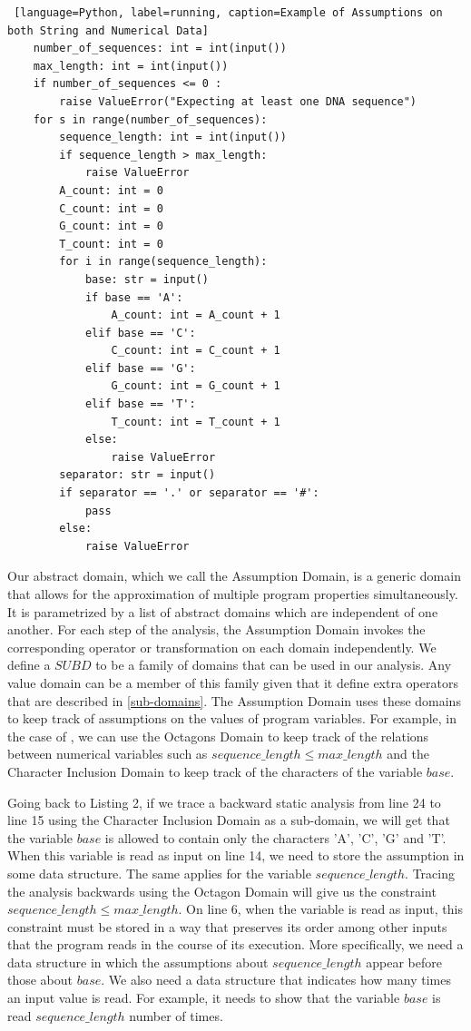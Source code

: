 \documentclass[10pt]{report}
\begin{document}
\begin{lstlisting} [language=Python, label=running, caption=Example of Assumptions on both String and Numerical Data]
	number_of_sequences: int = int(input())
	max_length: int = int(input())
	if number_of_sequences <= 0 :
		raise ValueError("Expecting at least one DNA sequence")
	for s in range(number_of_sequences):
		sequence_length: int = int(input())
		if sequence_length > max_length:
			raise ValueError
		A_count: int = 0
		C_count: int = 0
		G_count: int = 0
		T_count: int = 0
		for i in range(sequence_length):
			base: str = input()
			if base == 'A':
				A_count: int = A_count + 1
			elif base == 'C':
				C_count: int = C_count + 1
			elif base == 'G':
				G_count: int = G_count + 1
			elif base == 'T':
				T_count: int = T_count + 1
			else:
				raise ValueError
		separator: str = input()
		if separator == '.' or separator == '#':
			pass
		else:
			raise ValueError
\end{lstlisting}



Our abstract domain, which we call the Assumption Domain, is a generic domain that allows for the approximation of multiple program properties simultaneously. It is parametrized by a list of abstract domains which are independent of one another. For each step of the analysis, the Assumption Domain invokes the corresponding operator or transformation on each domain independently. We define a $ SUBD $ to be a family of domains that can be used in our analysis. Any value domain can be a member of this family given that it define extra operators that are described in \ref{sub-domains}. The Assumption Domain uses these domains to keep track of assumptions on the values of program variables. For example, in the case of , we can use the Octagons Domain \cite{octagon} to keep track of the relations between numerical variables such as $sequence\_length \leq max\_length$ and the Character Inclusion Domain \cite{character} to keep track of the characters of the variable $base$.

Going back to Listing 2, if we trace a backward static analysis from line 24 to line 15 using the Character Inclusion Domain as a sub-domain, we will get that the variable $ base $ is allowed to contain only the characters 'A', 'C', 'G' and 'T'. When this variable is read as input on line 14, we need to store the assumption in some data structure. The same applies for the variable $ sequence\_length $. Tracing the analysis backwards using the Octagon Domain will give us the constraint $ sequence\_length \leq max\_length $. On line 6, when the variable is read as input, this constraint must be stored in a way that preserves its order among other inputs that the program reads in the course of its execution. More specifically, we need a data structure in which the assumptions about $ sequence\_length$ appear before those about $ base $.  We also need a data structure that indicates how many times an input value is read. For example, it needs to show that the variable $ base $ is read $ sequence\_length $ number of times. 
\end{document}
